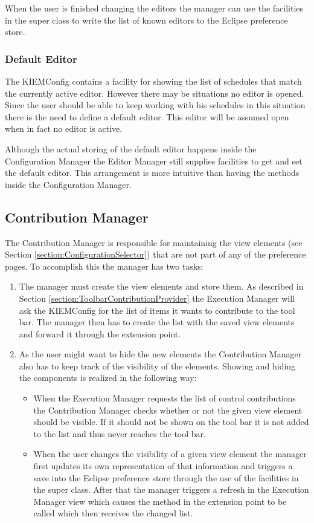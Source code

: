 When the user is finished changing the editors the manager can use the facilities in the super class to
write the list of known editors to the Eclipse preference store.


\subsubsection{Default Editor}
\label{section:DefaultEditor}
The \ac{KIEMConfig} contains a facility for showing the list of schedules that match the currently active
editor. However there may be situations no editor is opened. Since the user should be able to keep working
with his schedules in this situation there is the need to define a default editor. This editor will be assumed open 
when in fact no editor is active.

Although the actual storing of the default editor happens inside the Configuration Manager the Editor Manager
still supplies facilities to get and set the default editor. This arrangement is more intuitive than having
the methods inside the Configuration Manager.


\subsection{Contribution Manager}
\label{section:ContributionManager}
The Contribution Manager is responsible for maintaining the view elements (see Section \ref{section:ConfigurationSelector}) 
that are not part of any of the preference pages. To accomplish this the manager has two tasks:
\begin{enumerate}
 \item The manager must create the view elements and store them. As described in Section 
\ref{section:ToolbarContributionProvider} the Execution Manager will ask the \ac{KIEMConfig}
for the list of items it wants to contribute to the tool bar. The manager then has to 
create the list with the saved view elements and forward it through the extension point.
 \item As the user might want to hide the new elements the Contribution Manager also has to 
keep track of the visibility of the elements. Showing and hiding the components is realized
in the following way:
\begin{itemize}
 \item When the Execution Manager requests the list of control contributions the Contribution Manager
checks whether or not the given view element should be visible. If it should not be shown on the tool bar
it is not added to the list and thus never reaches the tool bar.
 \item When the user changes the visibility of a given view element the manager first updates its own
representation of that information and triggers a save into the Eclipse preference store through the use
of the facilities in the super class. After that the manager triggers a refresh in the Execution Manager
view which causes the method in the extension point to be called which then receives the changed list.
\end{itemize}
\end{enumerate}


